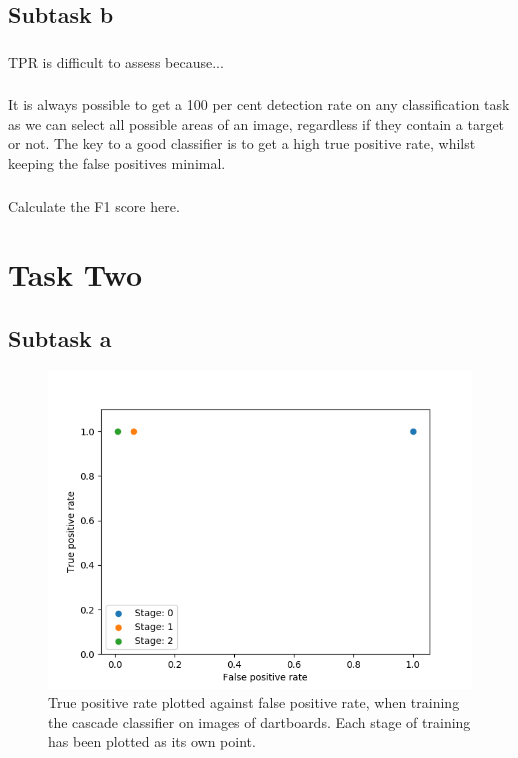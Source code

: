 \documentclass[conference]{IEEEtran}
\begin{document}
\subsection{Subtask b}
\subsubsection{}
TPR is difficult to assess because...
\subsubsection{}
It is always possible to get a 100 per cent detection rate on any classification task as we can select all possible areas of an image, regardless if they contain a target or not. The key to a good classifier is to get a high true positive rate, whilst keeping the false positives minimal. 

\subsubsection{}
Calculate the F1 score here. 



\section{Task Two}
\subsection{Subtask a}
\begin{figure}[htbp]
\begin{center}
\includegraphics[width=\linewidth]{images/TPRvsFPR}
\caption{True positive rate plotted against false positive rate, when training the cascade classifier on images of dartboards. Each stage of training has been plotted as its own point.}
\label{default}
\end{center}
\end{figure}
\end{document}

